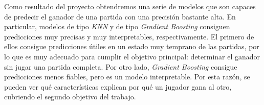 Como resultado del proyecto obtendremos una serie de modelos que son capaces
de predecir el ganador de una partida con una precisión bastante
alta. En particular, modelos de tipo \emph{KNN} y de tipo \emph{Gradient Boosting}
consiguen predicciones muy precisas y muy interpretables, respectivamente. %
El primero de ellos consigue predicciones útiles en un estado muy temprano
de las partidas, por lo que es muy adecuado para cumplir el objetivo principal:
determinar el ganador sin jugar una partida completa.
Por otro lado, \emph{Gradient Boosting} consigue predicciones menos fiables,
pero es un modelo interpretable. Por esta razón, se pueden ver qué
características explican por qué un jugador gana al otro, cubriendo el
segundo objetivo del trabajo.


